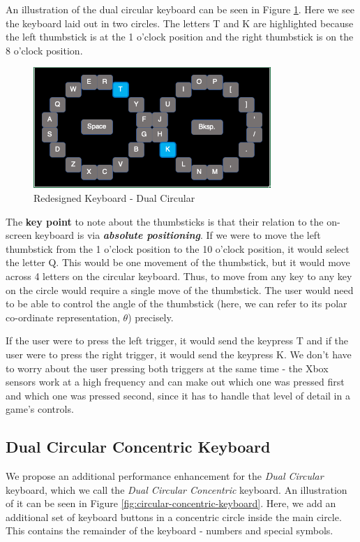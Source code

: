 \documentclass[
	letterpaper, %
]{jdf}
\begin{document}
An illustration of the dual circular keyboard can be seen in Figure \ref{fig:circular-keyboard}. Here we see the keyboard laid out in two circles. The letters T and K are highlighted because the left thumbstick is at the 1 o'clock position and the right thumbstick is on the 8 o'clock position. 

\begin{figure}[h]
	\centering
	\includegraphics[width=9cm]{jdf-master/Figures/dual-circular-keyboard.png}
	\caption{Redesigned Keyboard - Dual Circular}
	\label{fig:circular-keyboard}
\end{figure}

The \textbf{key point} to note about the thumbsticks is that their relation to the on-screen keyboard is via \textit{\textbf{absolute positioning}}. If we were to move the left thumbstick from the 1 o'clock position to the 10 o'clock position, it would select the letter Q. This would be one movement of the thumbstick, but it would move across 4 letters on the circular keyboard. Thus, to move from any key to any key on the circle would require a single move of the thumbstick. The user would need to be able to control the angle of the thumbstick (here, we can refer to its polar co-ordinate representation, $\theta$) precisely.

If the user were to press the left trigger, it would send the keypress T and if the user were to press the right trigger, it would send the keypress K. We don't have to worry about the user pressing both triggers at the same time - the Xbox sensors work at a high frequency and can make out which one was pressed first and which one was pressed second, since it has to handle that level of detail in a game's controls.



\subsection{Dual Circular Concentric Keyboard}
We propose an additional performance enhancement for the \textit{Dual Circular} keyboard, which we call the \textit{Dual Circular Concentric} keyboard. An illustration of it can be seen in Figure \ref{fig:circular-concentric-keyboard}. Here, we add an additional set of keyboard buttons in a concentric circle inside the main circle. This contains the remainder of the keyboard - numbers and special symbols. 
\end{document}
